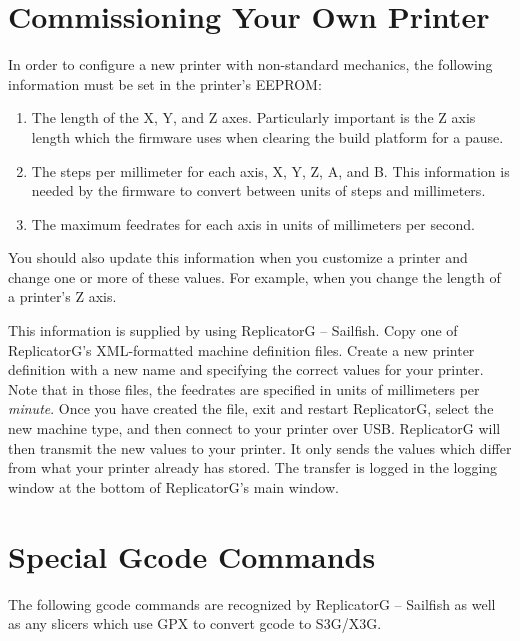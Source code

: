 
\section{Commissioning Your Own Printer} \label{sec:commission}

In order to configure a new printer with non-standard mechanics, the following information
must be set in the printer's EEPROM:

\begin{enumerate}
\item The length of the X, Y, and Z axes.  Particularly important is the Z axis length
 which the firmware uses when clearing the build platform for a pause.
\item The steps per millimeter for each axis, X, Y, Z, A, and B.  This information is needed by
 the firmware to convert between units of steps and millimeters.
\item The maximum feedrates for each axis in units of millimeters per second.
\end{enumerate}

\noindent
You should also update this information when you customize a printer and change one or more
of these values.  For example, when you change the length of a printer's Z axis.

This information is supplied by using ReplicatorG -- Sailfish.  Copy one of ReplicatorG's
XML-formatted machine definition files.  Create a new printer definition with a new name
and specifying the correct values for your printer.  Note that in those files, the feedrates
are specified in units of millimeters per \emph{minute}.  Once you have created the file,
exit and restart ReplicatorG, select the new machine type, and then connect to your printer
over USB.  ReplicatorG will then transmit the new values to your printer.  It only sends
the values which differ from what your printer already has stored.  The transfer is logged
in the logging window at the bottom of ReplicatorG's main window. 


\section{Special Gcode Commands} \label{sec:special-gcode}

The following gcode commands are recognized by ReplicatorG -- Sailfish as
well as any slicers which use \gls{GPX} to convert gcode to S3G/X3G.

